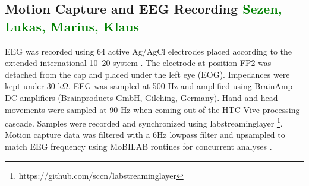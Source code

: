 \subsection{Motion Capture and EEG Recording \textcolor{green}{Sezen, Lukas, Marius, Klaus}}
EEG was recorded using 64 active Ag/AgCl electrodes placed according to the extended international 10–20 system \cite{chatrian_ten_1985}. The electrode at position FP2 was detached from the cap and placed under the left eye (EOG). Impedances were kept under 30 \si{\kohm}. EEG was sampled at 500 Hz and amplified using BrainAmp DC amplifiers (Brainproducts GmbH, Gilching, Germany). Hand and head movements were sampled at 90 Hz when coming out of the HTC Vive processing cascade. Samples were recorded and synchronized using labstreaminglayer \footnote{https://github.com/sccn/labstreaminglayer}.                                                                                                                                                                                                                                                                                                                                                                                                                                                     Motion capture data was filtered with a 6Hz lowpass filter and upsampled to match EEG frequency using MoBILAB routines for concurrent analyses \cite{Ojeda2014}.